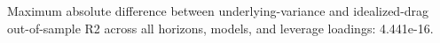 Maximum absolute difference between underlying-variance and idealized-drag out-of-sample R2 across all horizons, models, and leverage loadings: 4.441e-16.
